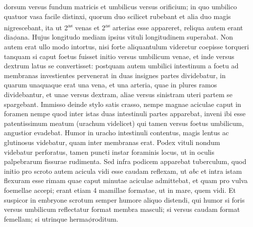 dorsum versus fundum matricis et umbilicus versus orificium; in quo umbilico quatuor vasa facile distinxi, quorum duo scilicet rubebant et alia duo magis nigrescebant, ita ut 2\textsuperscript{as} venas et 2\textsuperscript{as} arterias esse appareret, reliqua autem erant dia$\phi$ana.
Hujus longitudo mediam ipsius vituli longitudinem superabat.
Non autem erat ullo modo intortus, nisi forte aliquantulum videretur coepisse torqueri tanquam si caput foetus fuisset initio versus umbilicum venae, et inde versus dextrum latus se convertisset: postquam autem umbilici intestinum a foetu ad membranas
investientes pervenerat in duas insignes partes dividebatur, in quarum unaquaque erat una vena, et una arteria, quae in plures ramos dividebantur, et unae versus dextram, aliae versus sinistram uteri partem se spargebant.
\pend%
\pstart%
Immisso deinde stylo satis crasso, nempe magnae aciculae caput in foramen nempe quod inter istas duas intestinuli partes apparebat, inveni ibi esse patentissimum meatum (urachum videlicet) qui tamen versus foetus umbilicum, angustior evadebat. Humor in uracho intestinuli contentus, magis lentus ac glutinosus videbatur, quam inter membranas erat.
\pend%
\newpage
\pstart%
Podex vituli nondum videbatur perforatus,
tamen puncti instar foraminis locus, ut in oculis palpebrarum fissurae rudimenta. Sed infra podicem apparebat tuberculum, quod initio pro scroto
 autem acicula vidi esse
caudam reflexam, ut $abc$ et intra istam flexuram esse rimam
quae caput minutae aciculae admittebat, et quam pro vulva foemellae accepi; erant etiam 4 mamillae formatae, ut in mare, quem  vidi.
Et suspicor in embryone scrotum semper humore aliquo distendi, qui humor si foris versus umbilicum reflectatur format membra masculi; si versus caudam format femellam; si utrinque herma$\phi$roditum.
